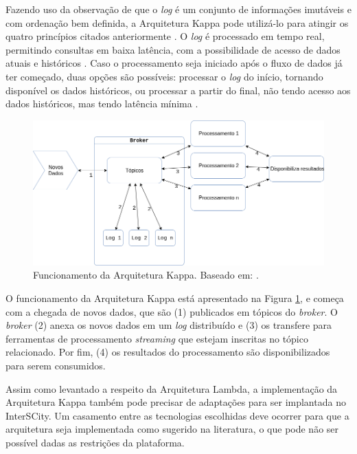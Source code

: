 Fazendo uso da observação de que o \textit{log} é um conjunto de informações
imutáveis e com ordenação bem definida, a Arquitetura Kappa pode utilizá-lo
para atingir os quatro princípios citados anteriormente \cite{kreps2014}. O
\textit{log} é processado em tempo real, permitindo consultas em baixa
latência, com a possibilidade de acesso de dados atuais e históricos
\cite{forgeat2015}. Caso o processamento seja iniciado após o fluxo de dados já
ter começado, duas opções são possíveis: processar o \textit{log} do início,
tornando disponível os dados históricos, ou processar a partir do final,
não tendo acesso aos dados históricos, mas tendo latência mínima
\cite{kreps2014}.

\begin{figure}
  \centering
    \includegraphics[scale=0.5]{figuras/kappa_architecture.png}
    \caption{Funcionamento da Arquitetura Kappa. Baseado em: .}
  \label{fig:kappa-lifecycle}
\end{figure}

O funcionamento da Arquitetura Kappa está apresentado na Figura
\ref{fig:kappa-lifecycle}, e começa com a chegada de novos dados,
que são (1) publicados em tópicos do \textit{broker}. O \textit{broker} (2) anexa
os novos dados em um \textit{log} distribuído e (3) os transfere para
ferramentas de processamento \textit{streaming} que estejam inscritas no tópico
relacionado. Por fim, (4) os resultados do processamento são disponibilizados
para serem consumidos.

Assim como levantado a respeito da Arquitetura Lambda, a implementação da
Arquitetura Kappa também pode precisar de adaptações para ser implantada no
InterSCity. Um casamento entre as tecnologias escolhidas deve ocorrer para que a
arquitetura seja implementada como sugerido na literatura, o que pode não ser
possível dadas as restrições da plataforma.

